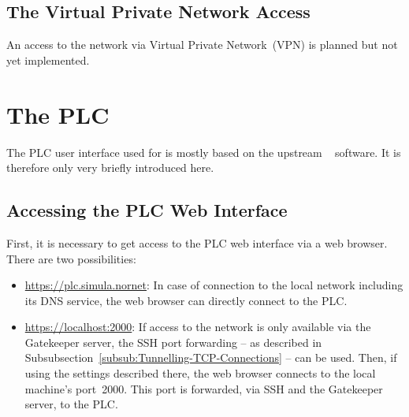 \subsection{The Virtual Private Network Access}
\label{sub:The-VPN-Access}

An access to the  network via Virtual Private Network~(VPN) is planned but not yet implemented.



\section{The PLC}
\label{sec:The-PLC}

The PLC user interface used for  is mostly based on the upstream ~\cite{PR06} software. It is therefore only very briefly introduced here.


\subsection{Accessing the PLC Web Interface}
\label{sub:Accessing-the-PLC-Web-Interface}

First, it is necessary to get access to the PLC web interface via a web browser. There are two possibilities:
\begin{itemize}
 \item \url{https://plc.simula.nornet}:
 In case of connection to the local  network including its DNS service, the web browser can directly connect to the PLC.
 
 \item \url{https://localhost:2000}:
 If access to the  network is only available via the Gatekeeper server, the SSH port forwarding -- as described in Subsubsection~\ref{subsub:Tunnelling-TCP-Connections} -- can be used. Then, if using the settings described there, the web browser connects to the local machine's port~2000. This port is forwarded, via SSH and the Gatekeeper server, to the PLC.
\end{itemize}


